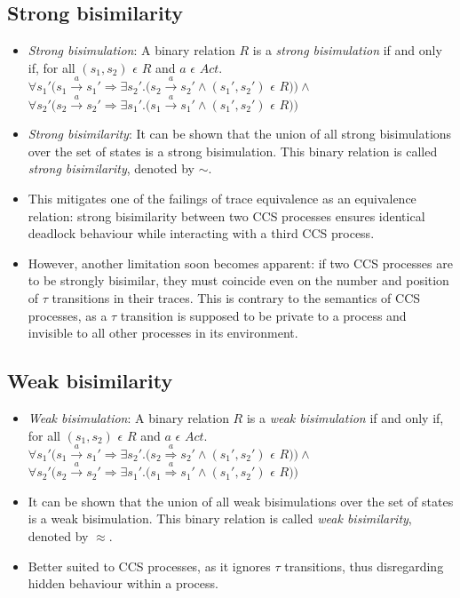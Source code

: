 \documentclass{article}
\begin{document}
\subsection{Strong bisimilarity}
  \begin{itemize}
  \item \emph{Strong bisimulation}: A binary relation $R$ is a \textit{strong
    bisimulation} if and only if, for all $(s_1, s_2)$ $\epsilon$ $R$ and $a$ $\epsilon$ $Act .$\\
    $\forall s_1' (s_1 \xrightarrow{a} s_1' \Rightarrow \exists s_2'
    . (s_2 \xrightarrow{a} s_2' \wedge (s_1', s_2')$ $\epsilon$ $R ) )
    \wedge $ \\
    $\forall s_2' (s_2 \xrightarrow{a} s_2' \Rightarrow \exists s_1'
    . (s_1 \xrightarrow{a} s_1' \wedge (s_1', s_2')$ $\epsilon$ $R ) )$
  \item \emph{Strong bisimilarity}: It can be shown that the union of
    all strong bisimulations
    over the set of states is a strong bisimulation. This binary
    relation is called \textit{strong bisimilarity}, denoted by $\sim$.
  \item This mitigates one of the failings of trace equivalence as an
    equivalence relation: strong bisimilarity between two CCS
    processes ensures identical deadlock behaviour while interacting
    with a third CCS process.
  \item However, another limitation soon becomes apparent: if two CCS
    processes are to be strongly bisimilar, they must coincide even on
    the number and position of $\tau$ transitions in their
    traces. This is contrary to the semantics of CCS processes, as
    a $\tau$ transition is supposed to be private to a process and
    invisible to all other processes in its environment.

  \end{itemize}

\subsection{Weak bisimilarity}

  \begin{itemize}
  \item \emph{Weak bisimulation}: A binary relation $R$ is a \textit{weak
    bisimulation} if and only if, for all $(s_1, s_2)$ $\epsilon$ $R$ and
    $a$ $\epsilon$ $Act .$\\
    $\forall s_1' (s_1 \xrightarrow{a} s_1' \Rightarrow \exists s_2'
    . (s_2 \overset{a}{\Rightarrow} s_2' \wedge (s_1', s_2')$ $\epsilon$ $R ) )
    \wedge $ \\
    $\forall s_2' (s_2 \xrightarrow{a} s_2' \Rightarrow \exists s_1'
    . (s_1 \overset{a}{\Rightarrow} s_1' \wedge (s_1', s_2')$ $\epsilon$ $R ) )$
  \item It can be shown that the union of all weak bisimulations
    over the set of states is a weak bisimulation. This binary
    relation is called \textit{weak bisimilarity}, denoted by $\approx$.
  \item Better suited to CCS processes,
    as it ignores $\tau$ transitions, thus disregarding hidden
    behaviour within a process.
  \end{itemize}
\end{document}
